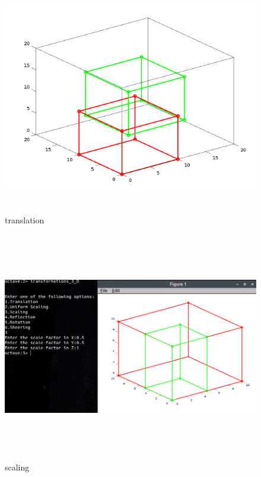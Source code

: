 \begin{figure}[ht!]
\centering
\includegraphics[width=150mm, height=100mm]{translation.png}
\caption{translation \label{overflow}}
\end{figure}
\begin{figure}[ht!]
\centering
\includegraphics[width=150mm, height=100mm]{scaling.png}
\caption{scaling \label{overflow}}
\end{figure}
